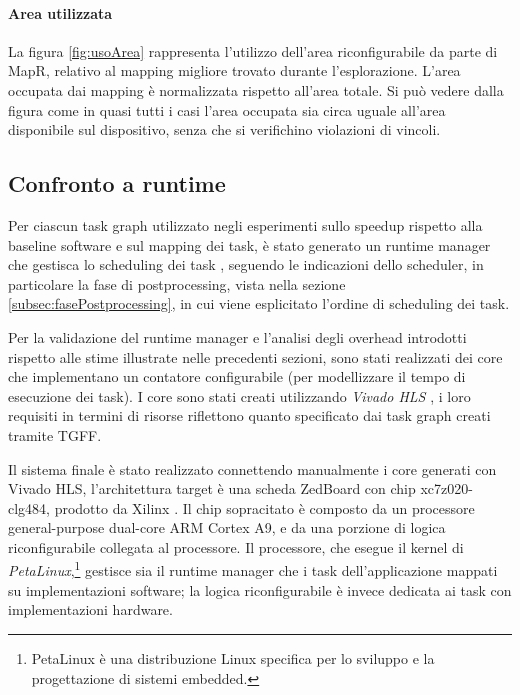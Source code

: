 \paragraph{Area utilizzata}
La figura \ref{fig:usoArea} rappresenta l'utilizzo dell'area
riconfigurabile da parte di MapR, relativo al mapping migliore trovato durante
l'esplorazione. L'area occupata dai mapping \`e normalizzata rispetto all'area totale.
Si pu\`o vedere dalla figura come in quasi tutti i casi l'area occupata sia
circa uguale all'area disponibile sul dispositivo, senza che si verifichino
violazioni di vincoli.

\subsection{Confronto a runtime}
Per ciascun task graph utilizzato negli esperimenti sullo speedup rispetto alla baseline software
e sul mapping dei task, \`e stato generato un runtime manager che gestisca lo scheduling dei task \cite{DurelliRuntimeManager},
seguendo le indicazioni dello scheduler, in particolare la fase di postprocessing, vista nella sezione
\ref{subsec:fasePostprocessing}, in cui viene esplicitato l'ordine di scheduling dei task.

Per la validazione del runtime manager e l'analisi degli overhead introdotti rispetto alle stime
illustrate nelle precedenti sezioni, sono stati realizzati dei core che implementano un contatore
configurabile (per modellizzare il tempo di esecuzione dei task). I core sono stati creati utilizzando
\emph{Vivado HLS} \cite{VivadoHLS}, i loro requisiti in termini di risorse riflettono quanto
specificato dai task graph creati tramite \ac{TGFF}.

Il sistema finale \`e stato realizzato connettendo manualmente i core generati con Vivado HLS,
l'architettura target \`e una scheda ZedBoard con chip xc7z020-clg484, prodotto da Xilinx
\cite{XilinxZC702}. Il chip sopracitato \`e composto da un processore general-purpose dual-core
ARM Cortex A9, e da una porzione di logica riconfigurabile collegata al processore.
Il processore, che esegue il kernel di \emph{PetaLinux},\footnote{PetaLinux \`e una distribuzione
Linux specifica per lo sviluppo e la progettazione di sistemi embedded.} gestisce
sia il runtime manager che i task dell'applicazione mappati su implementazioni software;
la logica riconfigurabile \`e invece dedicata ai task con implementazioni hardware.

